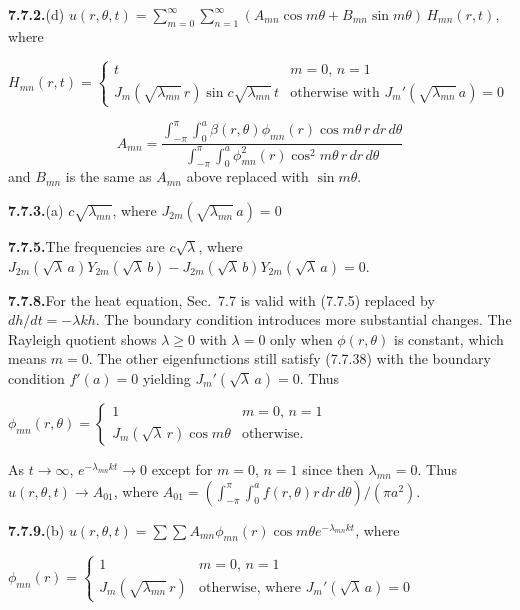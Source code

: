 \medskip
\textbf{7.7.2.}\quad (d) $u(r,\theta,t) = \sum_{m=0}^{\infty}\sum_{n=1}^{\infty}(A_{mn}\cos m\theta + B_{mn}\sin m\theta)\,H_{mn}(r,t)$, where

$H_{mn}(r,t) = \begin{cases} t & m=0,\,n=1 \\ J_m(\sqrt{\lambda_{mn}}\,r)\sin c\sqrt{\lambda_{mn}}\,t & \text{otherwise with } J_m'(\sqrt{\lambda_{mn}}\,a) = 0 \end{cases}$

\[
A_{mn} = \dfrac{\int_{-\pi}^{\pi}\int_0^a \beta(r,\theta)\phi_{mn}(r)\cos m\theta\,r\,dr\,d\theta}{\int_{-\pi}^{\pi}\int_0^a \phi_{mn}^2(r)\cos^2 m\theta\,r\,dr\,d\theta}
\]
and $B_{mn}$ is the same as $A_{mn}$ above replaced with $\sin m\theta$.

\medskip
\textbf{7.7.3.}\quad (a) $c\sqrt{\lambda_{mn}}$, where $J_{2m}(\sqrt{\lambda_{mn}}\,a) = 0$

\medskip
\textbf{7.7.5.}\quad The frequencies are $c\sqrt{\lambda}$,
where $J_{2m}\!\left(\sqrt{\lambda}\,a\right) Y_{2m}\!\left(\sqrt{\lambda}\,b\right) - J_{2m}\!\left(\sqrt{\lambda}\,b\right) Y_{2m}\!\left(\sqrt{\lambda}\,a\right) = 0$.

\medskip
\textbf{7.7.8.}\quad For the heat equation, Sec.~7.7 is valid with (7.7.5) replaced by $dh/dt = -\lambda kh$.
The boundary condition introduces more substantial changes. The Rayleigh quotient shows $\lambda \geq 0$ with $\lambda = 0$ only when $\phi(r,\theta)$ is constant, which means $m=0$. The other eigenfunctions still satisfy (7.7.38) with the boundary condition $f'(a) = 0$ yielding $J_m'(\sqrt{\lambda}\,a) = 0$. Thus

$\phi_{mn}(r,\theta) = \begin{cases} 1 & m=0,\,n=1 \\ J_m(\sqrt{\lambda}\,r)\cos m\theta & \text{otherwise.}\end{cases}$

As $t\to\infty$, $e^{-\lambda_{mn}kt}\to 0$ except for $m=0$, $n=1$ since then $\lambda_{mn}=0$. Thus $u(r,\theta,t)\to A_{01}$, where $A_{01} = \left(\int_{-\pi}^{\pi}\int_0^a f(r,\theta)r\,dr\,d\theta\right)/(\pi a^2)$.

\medskip
\textbf{7.7.9.}\quad (b)
$u(r,\theta,t) = \sum\sum A_{mn}\phi_{mn}(r)\cos m\theta e^{-\lambda_{mn}kt}$, where

$\phi_{mn}(r) = \begin{cases} 1 & m=0,\,n=1 \\ J_m(\sqrt{\lambda_{mn}}\,r) & \text{otherwise, where } J_m'(\sqrt{\lambda}\,a)=0 \end{cases}$

